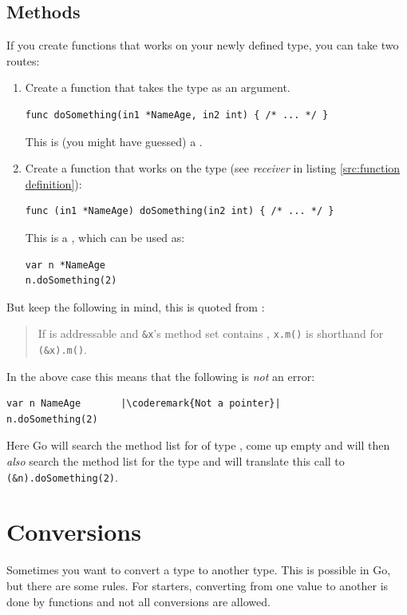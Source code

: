 \subsection{Methods}
\label{sec:methods}
If you create functions that works on your newly defined type, you can
take two routes:
\begin{enumerate}
\item Create a function that takes the type as an argument.
\begin{lstlisting}
func doSomething(in1 *NameAge, in2 int) { /* ... */ }
\end{lstlisting}
This is (you might have guessed) a .
\item Create a function that works on the type (see \emph{receiver} in
listing \ref{src:function definition}):
\begin{lstlisting}
func (in1 *NameAge) doSomething(in2 int) { /* ... */ }
\end{lstlisting}
This is a , which can be
used as: 
\begin{lstlisting}
var n *NameAge
n.doSomething(2)
\end{lstlisting}
\end{enumerate}
But keep the following in mind, this is quoted from \cite{go_spec}:
\begin{quote}
If  is
addressable and \lstinline{&x}'s method set contains , 
\lstinline{x.m()} is shorthand for \lstinline{(&x).m()}.
\end{quote}
In the above case this means that the following is \emph{not} an 
error:
\begin{lstlisting}
var n NameAge	    |\coderemark{Not a pointer}|
n.doSomething(2)    
\end{lstlisting}
Here Go will search the method list for  of type ,
come up empty and will then \emph{also} search the method list for
the type  and will translate this call to
\lstinline{(&n).doSomething(2)}.

\section{Conversions}
\label{sec:conversions}
Sometimes you want to convert a type to another type. 
This is possible in Go, but
there are some rules. For starters, converting from one value to another
is done by functions and not all conversions are allowed.

\begin{table}[H]
\begin{center}
\caption[Valid conversions]{Valid conversions, 
\lstinline{float64} works the same as \lstinline{float32}}
\label{tab:convesion}

\end{center}
\end{table}

